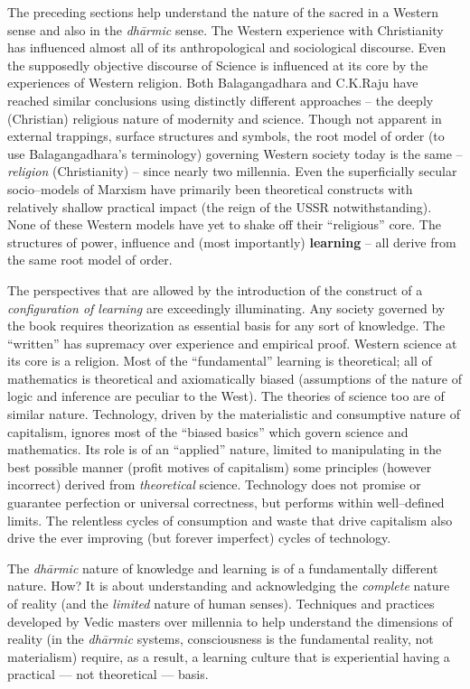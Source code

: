 The preceding sections help understand the nature of the sacred in a Western sense and also in the \textit{dhārmic} sense. The Western experience with Christianity has influenced almost all of its anthropological and sociological discourse. Even the supposedly objective discourse of Science is influenced at its core by the experiences of Western religion. Both Balagangadhara and C.K.Raju have reached similar conclusions using distinctly different approaches – the deeply (Christian) religious nature of modernity and science. Though not apparent in external trappings, surface structures and symbols, the root model of order (to use Balagangadhara's terminology) governing Western society today is the same – \textit{religion} (Christianity) – since nearly two millennia. Even the superficially secular socio–models of Marxism have primarily been theoretical constructs with relatively shallow practical impact (the reign of the USSR notwithstanding). None of these Western models have yet to shake off their “religious” core. The structures of power, influence and (most importantly) \textbf{learning} – all derive from the same root model of order.

The perspectives that are allowed by the introduction of the construct of a \textit{configuration of learning} are exceedingly illuminating. Any society governed by the book requires theorization as essential basis for any sort of knowledge. The “written” has supremacy over experience and empirical proof. Western science at its core is a religion. Most of the “fundamental” learning is theoretical; all of mathematics is theoretical and axiomatically biased (assumptions of the nature of logic and inference are peculiar to the West). The theories of science too are of similar nature. Technology, driven by the materialistic and consumptive nature of capitalism, ignores most of the “biased basics” which govern science and mathematics. Its role is of an “applied” nature, limited to manipulating in the best possible manner (profit motives of capitalism) some principles (however incorrect) derived from \textit{theoretical} science. Technology does not promise or guarantee perfection or universal correctness, but performs within well–defined limits. The relentless cycles of consumption and waste that drive capitalism also drive the ever improving (but forever imperfect) cycles of technology.

The \textit{dhārmic} nature of knowledge and learning is of a fundamentally different nature. How? It is about understanding and acknowledging the \textit{complete} nature of reality (and the \textit{limited} nature of human senses). Techniques and practices developed by Vedic masters over millennia to help understand the dimensions of reality (in the \textit{dhārmic} systems, consciousness is the fundamental reality, not materialism) require, as a result, a learning culture that is experiential having a practical — not theoretical — basis.

